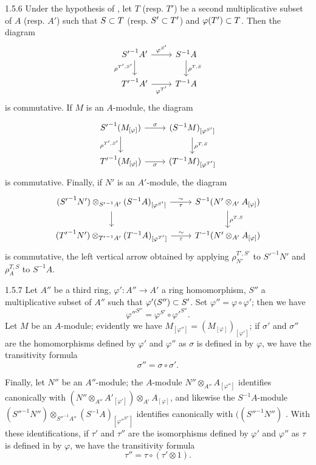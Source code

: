 \documentclass[../main.tex]{subfiles}
\begin{document}
\begin{env}{1.5.6}
Under the hypothesis of , let $T$ (resp. $T'$) be a second multiplicative subset of $A$
(resp. $A'$) such that $S\subset T$ (resp. $S'\subset T'$) and $\varphi(T')\subset T$. Then the diagram
\[\begin{tikzcd}
  {S'}^{-1}A'\ar[r,"\varphi^{S'}"]\ar[d,"\rho^{T',S'}"'] & S^{-1}A\ar[d,"\rho^{T,S}"]\\
  {T'}^{-1}A'\ar[r,"\varphi^{T'}"'] & T^{-1}A
\end{tikzcd}\]
is commutative. If $M$ is an $A$-module, the diagram
\[\begin{tikzcd}
  {S'}^{-1}(M_{[\varphi]})\ar[r,"\sigma"]\ar[d,"\rho^{T',S'}"'] &
  (S^{-1}M)_{[\varphi^{S'}]}\ar[d,"\rho^{T,S}"]\\
  {T'}^{-1}(M_{[\varphi]})\ar[r,"\sigma"'] & (T^{-1}M)_{[\varphi^{T'}]}
\end{tikzcd}\]
is commutative. Finally, if $N'$ is an $A'$-module, the diagram
\[\begin{tikzcd}
  ({S'}^{-1}N')\otimes_{{S'}^{-1}A'}(S^{-1}A)_{[\varphi^{S'}]}
  \ar[r,"\sim","\tau"'] \ar[d] &
  S^{-1}(N'\otimes_{A'}A_{[\varphi]})\ar[d,"\rho^{T,S}"]\\
  ({T'}^{-1}N')\otimes_{{T'}^{-1}A'}(T^{-1}A)_{[\varphi^{T'}]}
  \ar[r,"\sim","\tau"'] & T^{-1}(N'\otimes_{A'}A_{[\varphi]})
\end{tikzcd}\]
is commutative, the left vertical arrow obtained by applying
$\rho_{N'}^{T',S'}$ to ${S'}^{-1}N'$ and $\rho_A^{T,S}$ to $S^{-1}A$.
\end{env}

\begin{env}{1.5.7}
Let $A''$ be a third ring, $\varphi':A''\to A'$ a ring homomorphism,
$S''$ a multiplicative subset of $A''$ such that $\varphi'(S'')\subset S'$. Set
$\varphi''=\varphi\circ\varphi'$; then we have
\[
  {\varphi''}^{S''}=\varphi^{S'}\circ{\varphi'}^{S''}.
\]
Let $M$ be an $A$-module; evidently we have $M_{[\varphi'']}=(M_{[\varphi]})_{[\varphi']}$;
if $\sigma'$ and $\sigma''$ are the homomorphisms defined by $\varphi'$ and $\varphi''$ as
$\sigma$ is defined in  by $\varphi$, we have the transitivity formula
\[
  \sigma''=\sigma\circ\sigma'.
\]

Finally, let $N''$ be an $A''$-module; the $A$-module $N''\otimes_{A''}A_{[\varphi'']}$
identifies canonically with
$(N''\otimes_{A''}{A'}_{[\varphi']})\otimes_{A'}A_{[\varphi]}$,
and likewise the $S^{-1}A$-module
${({S''}^{-1}N'')\otimes_{{S''}^{-1}A''}(S^{-1}A)_{[{\varphi''}^{S''}]}}$ identifies
canonically with
$(({S''}^{-1}N'')$ . With these identifications, if $\tau'$
and $\tau''$ are the isomorphisms defined by $\varphi'$ and $\varphi''$ as $\tau$ is defined
in  by $\varphi$, we have the transitivity formula
\[
  \tau''=\tau\circ(\tau'\otimes 1).
\]
\end{env}
\end{document}
